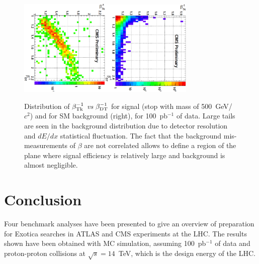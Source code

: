 \documentclass{cmspaper}
\begin{document}
\begin{figure}[htbp] 
\centering
\includegraphics[angle=90,width=0.38\textwidth]{betaHSCPSig.eps}\includegraphics[angle=90,width=0.38\textwidth]{betaHSCPBkg.eps}  
\caption{Distribution of $\beta_{{\rm Tk}}^{-1}$ {\it vs} $\beta_{{\rm DT}}^{-1}$  
for signal (stop with mass of 500~GeV/$c^2$) and for SM background (right), 
for 100~pb$^{-1}$ of data. Large tails are seen in the background distribution due 
to detector resolution and $dE/dx$ statistical fluctuation.
The fact that the background mis-measurements of $\beta$ are not correlated  
allows to define a region of the plane where signal efficiency is 
relatively large and background is almost negligible.}
\label{fig:HSCPSigBkgPlots}
\end{figure}

\section{Conclusion} \label{Conclusion}
Four benchmark analyses have been presented to give an
overview of preparation for Exotica searches in ATLAS and CMS 
experiments at the LHC. The results shown have been obtained with 
MC simulation, assuming 100~pb$^{-1}$ of data and proton-proton collisions
at $\sqrt{s} = 14$~TeV, which is the design energy of the LHC.
\end{document}

